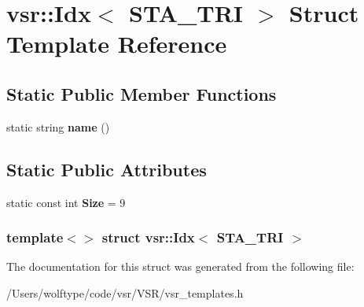 \hypertarget{structvsr_1_1_idx_3_01_s_t_a___t_r_i_01_4}{\section{vsr\-:\-:Idx$<$ S\-T\-A\-\_\-\-T\-R\-I $>$ Struct Template Reference}
\label{structvsr_1_1_idx_3_01_s_t_a___t_r_i_01_4}
}
\subsection*{Static Public Member Functions}
\begin{DoxyCompactItemize}
\item 
\hypertarget{structvsr_1_1_idx_3_01_s_t_a___t_r_i_01_4_a7d6538163bc32073eb3f9520441b89e0}{static string {\bfseries name} ()}\label{structvsr_1_1_idx_3_01_s_t_a___t_r_i_01_4_a7d6538163bc32073eb3f9520441b89e0}

\end{DoxyCompactItemize}
\subsection*{Static Public Attributes}
\begin{DoxyCompactItemize}
\item 
\hypertarget{structvsr_1_1_idx_3_01_s_t_a___t_r_i_01_4_a8a09624625de49384ec94f19a51a7a31}{static const int {\bfseries Size} = 9}\label{structvsr_1_1_idx_3_01_s_t_a___t_r_i_01_4_a8a09624625de49384ec94f19a51a7a31}

\end{DoxyCompactItemize}
\subsubsection*{template$<$$>$ struct vsr\-::\-Idx$<$ S\-T\-A\-\_\-\-T\-R\-I $>$}



The documentation for this struct was generated from the following file\-:\begin{DoxyCompactItemize}
\item 
/\-Users/wolftype/code/vsr/\-V\-S\-R/vsr\-\_\-templates.\-h\end{DoxyCompactItemize}
